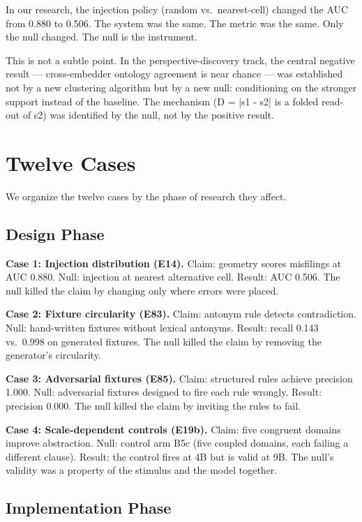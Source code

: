 \documentclass[11pt]{article}
\begin{document}
In our research, the injection policy (random vs.\ nearest-cell) changed
the AUC from 0.880 to 0.506. The system was the same. The metric was the
same. Only the null changed. The null is the instrument.

This is not a subtle point. In the perspective-discovery track, the
central negative result --- cross-embedder ontology agreement is near
chance --- was established not by a new clustering algorithm but by a new
null: conditioning on the stronger support instead of the baseline. The
mechanism (D = |s1 - s2| is a folded read-out of s2) was identified by
the null, not by the positive result.

\section{Twelve Cases}

We organize the twelve cases by the phase of research they affect.

\subsection{Design Phase}

\textbf{Case 1: Injection distribution (E14).} Claim: geometry scores
misfilings at AUC 0.880. Null: injection at nearest alternative cell.
Result: AUC 0.506. The null killed the claim by changing only where
errors were placed.

\textbf{Case 2: Fixture circularity (E83).} Claim: antonym rule detects
contradiction. Null: hand-written fixtures without lexical antonyms.
Result: recall 0.143 vs.\ 0.998 on generated fixtures. The null killed
the claim by removing the generator's circularity.

\textbf{Case 3: Adversarial fixtures (E85).} Claim: structured rules
achieve precision 1.000. Null: adversarial fixtures designed to fire
each rule wrongly. Result: precision 0.000. The null killed the claim by
inviting the rules to fail.

\textbf{Case 4: Scale-dependent controls (E19b).} Claim: five congruent
domains improve abstraction. Null: control arm B5c (five coupled domains,
each failing a different clause). Result: the control fires at 4B but is
valid at 9B. The null's validity was a property of the stimulus and the
model together.

\subsection{Implementation Phase}
\end{document}
